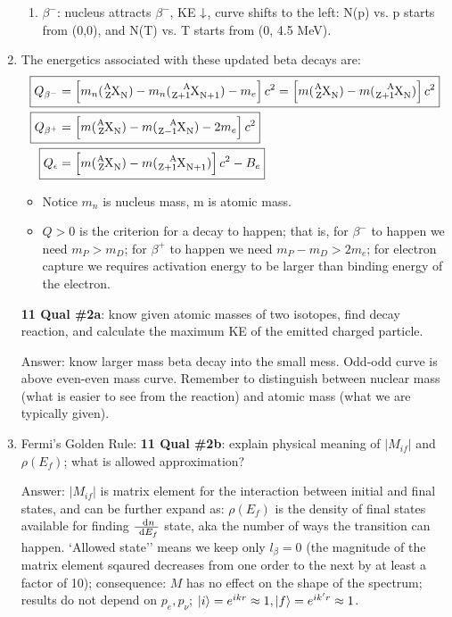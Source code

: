 \documentclass{school-22.101-notes}
\begin{document}
\begin{enumerate}
\begin{enumerate}
    \item $\beta^-$: nucleus attracts $\beta^-$, KE $\downarrow$, curve shifts to the left: N(p) vs. p starts from (0,0), and N(T) vs. T starts from (0, 4.5 MeV). 
    \end{enumerate}
\item The energetics associated with these updated beta decays are:
\begin{align}
\Aboxed{ Q_{\beta^-} &= \left[ m_n (\ce{^A_Z X_N}) - m_n (\ce{^A_{Z+1} X_{N+1}}) - m_e \right] c^2 = \left[ m (\ce{^A_Z X_N}) - m (\ce{^A_{Z+1} X_{N}}) \right] c^2 } \\
\Aboxed{ Q_{\beta^+} &= \left[ m (\ce{^A_Z X_N}) - m (\ce{^A_{Z-1} X_{N}}) - 2m_e \right] c^2 } \\
\Aboxed{Q_{\epsilon} &= \left[ m (\ce{^A_Z X_N}) - m (\ce{^A_{Z+1} X_{N+1}}) \right] c^2 - B_e}
\end{align}
\begin{itemize}
\item Notice $m_n$ is nucleus mass, m is atomic mass. 
\item $Q>0$ is the criterion for a decay to happen; that is, for $\beta^-$ to happen we need $m_P > m_D$; for $\beta^+$ to happen we need $m_P - m_D > 2 m_e$; for electron capture we requires activation energy to be larger than binding energy of the electron.  
\end{itemize}

\textbf{11 Qual \#2a}: know given atomic masses of two isotopes, find decay reaction, and calculate the maximum KE of the emitted charged particle. 

Answer: know larger mass beta decay into the small mess. Odd-odd curve is above even-even mass curve. Remember to distinguish between nuclear mass (what is easier to see from the reaction) and atomic mass (what we are typically given). 

\item Fermi's Golden Rule:
\textbf{11 Qual \#2b}: explain physical meaning of $|M_{if}|$ and $\rho(E_f)$; what is allowed approximation? 

Answer: $|M_{if}|$ is matrix element for the interaction between initial and final states, and can be further expand as: 
$\rho(E_f)$ is the density of final states available for finding $\frac{\mbox{ }\mathrm{d} n}{\mbox{ }\mathrm{d} E_f}$ state, aka the number of ways the transition can happen. `Allowed state'' means we keep only $l_{\beta}=0$ (the magnitude of the matrix element sqaured decreases from one order to the next by at least a factor of 10); consequence: $M$ has no effect on the shape of the spectrum; results do not depend on $p_e, p_{\nu}$; $\left| i \right> = e^{ikr} \approx 1, \left| f \right> = e^{i k' r} \approx 1$. 


\end{enumerate}
\end{document}
